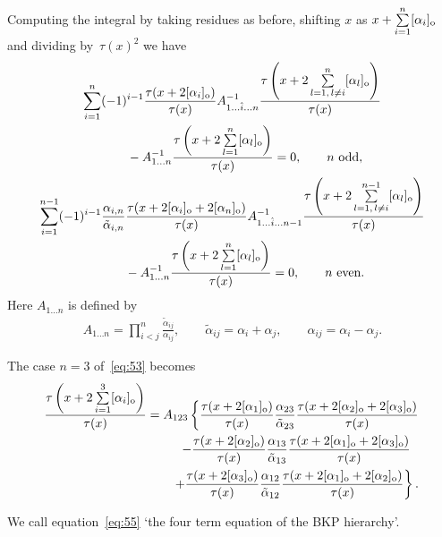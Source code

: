 Computing the integral by taking residues as before, shifting $x$ as $x+\sum\limits_{i=1}^{n}[\alpha_i]_{\rm o}$ and
divi\-ding by~$\tau(x)^2$ we have
\begin{gather}
\sum_{i=1}^{n}(-1)^{i-1}\frac{\tau(x+2[\alpha_i]_{\rm o})}{\tau(x)}A_{1\dots\hat{i}\dots n}^{-1}
\frac{\tau\left(x+2\sum\limits_{l=1,\, l\neq i}^n[\alpha_l]_{\rm o}\right)}{\tau(x)}\nonumber
\\
\qquad
{}-A_{1\dots n}^{-1}\frac{\tau\left(x+2\sum\limits_{l=1}^{n}[\alpha_l]_{\rm o}\right)}{\tau(x)}=0,\qquad  n \ \text{odd},
\label{eq:53}
\\
\sum_{i=1}^{n-1}(-1)^{i-1}\frac{\alpha_{i,n}}{\tilde{\alpha}_{i,n}}
\frac{\tau(x+2[\alpha_i]_{\rm o}+2[\alpha_n]_{\rm o})}{\tau(x)}A_{1\dots\hat{i}\dots n-1}^{-1}
\frac{\tau\left(x+2\sum\limits_{l=1,\, l\neq i}^{n-1}[\alpha_l]_{\rm o}\right)}{\tau(x)}\nonumber
\\
\qquad
{} -A_{1\dots n}^{-1}\frac{\tau\left(x+2\sum\limits_{l=1}^{n}[\alpha_l]_{\rm o}\right)}{\tau(x)}=0,\qquad  n \ \text{even}.
\label{eq:54}
\end{gather}
Here $A_{1\dots n}$ is def\/ined by
\begin{gather*}
A_{1\dots n}=\prod_{i<j}^{n}\frac{\tilde{\alpha}_{ij}}{\alpha_{ij}},\qquad \tilde{\alpha}_{ij}
=\alpha_i+\alpha_j,\qquad \alpha_{ij}=\alpha_i-\alpha_j.
\end{gather*}
\begin{example}\label{example3}
The case $n=3$ of~\eqref{eq:53} becomes
\begin{gather}
\frac{\tau\left(x+2\sum\limits_{i=1}^{3}[\alpha_i]_{\rm o}\right)}{\tau(x)}=A_{123}\left\{\frac{\tau(x+2[\alpha_1]_{\rm o})}{\tau(x)}
\frac{\alpha_{23}}{\tilde{\alpha}_{23}}\frac{\tau(x+2[\alpha_2]_{\rm o}+2[\alpha_3]_{\rm o})}{\tau(x)}\right.
\nonumber
\\
\hskip36mm-\frac{\tau(x+2[\alpha_2]_{\rm o})}{\tau(x)}\frac{\alpha_{13}}{\tilde{\alpha}_{13}}
\frac{\tau(x+2[\alpha_1]_{\rm o}+2[\alpha_3]_{\rm o})}{\tau(x)}\nonumber
\\
\hskip36mm\left.
+\frac{\tau(x+2[\alpha_3]_{\rm o})}{\tau(x)}\frac{\alpha_{12}}{\tilde{\alpha}_{12}}
\frac{\tau(x+2[\alpha_1]_{\rm o}+2[\alpha_2]_{\rm o})}{\tau(x)}\right\}.
\label{eq:55}
\end{gather}
\end{example}
We call equation~\eqref{eq:55} `the four term equation of the BKP hierarchy'.
